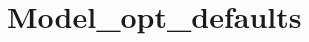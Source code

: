 \hypertarget{group__model__opt__defaults}{}\section{Model\+\_\+opt\+\_\+defaults}
\label{group__model__opt__defaults}

